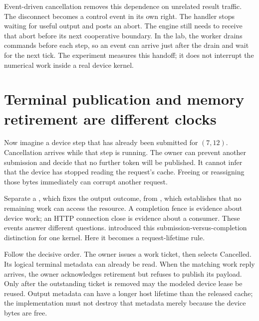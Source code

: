 Event-driven cancellation removes this dependence on unrelated result
traffic. The disconnect becomes a control event in its own right. The
handler stops waiting for useful output and posts an abort. The engine still
needs to receive that abort before its next cooperative boundary.
In the lab, the worker drains commands before each step, so an event can
arrive just after the drain and wait for the next tick. The experiment
measures this handoff; it does not interrupt the numerical work inside a
real device kernel.

\section{Terminal publication and memory retirement are different clocks}
Now imagine a device step that has already been submitted for $(7,12)$.
Cancellation arrives while that step is running. The owner can prevent
another submission and decide that no further token will be published.
It cannot infer that the device has stopped reading the request's cache.
Freeing or reassigning those bytes immediately can corrupt another request.

Separate a , which fixes the output outcome, from
, which establishes that no remaining work can
access the resource. A completion fence is evidence about device work;
an HTTP connection close is evidence about a consumer. These events
answer different questions.  introduced this
submission-versus-completion distinction for one kernel. Here it becomes
a request-lifetime rule.


Follow the decisive order. The owner issues a work ticket, then selects
Cancelled. Its logical terminal metadata can already be read. When the
matching work reply arrives, the owner acknowledges retirement but refuses
to publish its payload. Only after the outstanding ticket is removed may
the modeled device lease be reused. Output metadata can have a longer host
lifetime than the released cache; the implementation must not destroy that
metadata merely because the device bytes are free.

